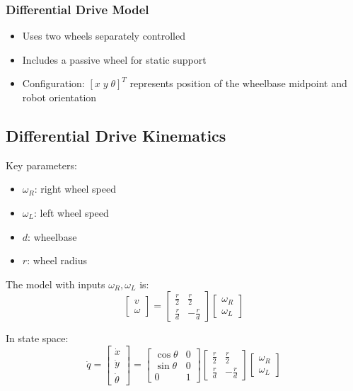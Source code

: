 \documentclass[openany]{book}
\theoremstyle{definition}
\theoremstyle{remark}
\begin{document}
\subsubsection{Differential Drive Model}
\begin{itemize}
    \item Uses two wheels separately controlled
    \item Includes a passive wheel for static support
    \item Configuration: $[x \; y \; \theta]^T$ represents position of the wheelbase midpoint and robot orientation
\end{itemize}

\subsection{Differential Drive Kinematics}
Key parameters:
\begin{itemize}
    \item $\omega_R$: right wheel speed
    \item $\omega_L$: left wheel speed
    \item $d$: wheelbase
    \item $r$: wheel radius
\end{itemize}

The model with inputs $\omega_R, \omega_L$ is:
\begin{equation}
    \begin{bmatrix}v\\\omega\end{bmatrix} = \begin{bmatrix}\frac{r}{2} & \frac{r}{2}\\\frac{r}{d} & -\frac{r}{d}\end{bmatrix}\begin{bmatrix}\omega_R\\\omega_L\end{bmatrix}
\end{equation}

In state space:
\begin{equation}
    \dot{q} = \begin{bmatrix}\dot{x}\\\dot{y}\\\dot{\theta}\end{bmatrix} = \begin{bmatrix}\cos \theta & 0\\\sin \theta & 0\\0 & 1\end{bmatrix}\begin{bmatrix}\frac{r}{2} & \frac{r}{2}\\\frac{r}{d} & -\frac{r}{d}\end{bmatrix}\begin{bmatrix}\omega_R\\\omega_L\end{bmatrix}
\end{equation}
\end{document}
